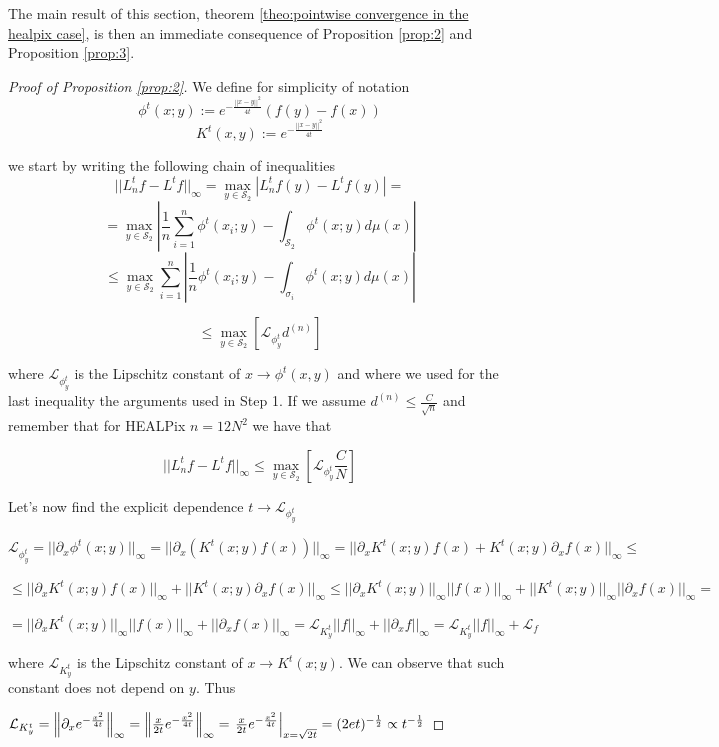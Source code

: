 The main result of this section, theorem  \ref{theo:pointwise convergence in the healpix case}, is then an immediate consequence of Proposition \ref{prop:2} and Proposition \ref{prop:3}.


\begin{proof}[Proof of Proposition \ref{prop:2}]
	
	We define for simplicity of notation
	$$\phi^t(x;y) := e^{-\frac{||x-y||^2}{4t}}\left(f(y)-f(x)\right)$$
	$$K^t(x,y) :=  e^{-\frac{||x-y||^2}{4t}}$$

	
	we start by writing the following chain of inequalities
	$$||L_n^tf-L^tf||_\infty = \max _{y\in \mathcal S_2} \left|L_n^tf(y)-L^tf(y)\right|=$$
	$$= \max _{y\in \mathcal S_2} \left| \frac{1}{n} \sum_{i=1}^n \phi^t(x_i; y)- \int_{\mathcal S_2} \phi^t(x;y)d\mu(x) \right|$$
	$$\leq \max _{y\in \mathcal S_2}  \sum_{i=1}^n   \left| \frac{1}{n}  \phi^t(x_i; y)- \int_{\sigma_i} \phi^t(x;y)d\mu(x) \right|$$

	$$\leq  \max _{y\in \mathcal S_2} \left[\mathcal L_{\phi^t_y}d^{(n)} \right]$$
	
	where $\mathcal L_{\phi^t_y}$ is the Lipschitz constant of $x \rightarrow \phi^t(x, y)$ and where we used for the last inequality the arguments used in Step 1. If we assume $d^{(n)}\leq \frac{C}{\sqrt{n}}$ and remember that for HEALPix $n=12N^2$ we have that
	
	$$||L_n^tf-L^tf||_\infty  \leq  \max _{y\in \mathcal S_2} \left[ \mathcal L_{\phi^t_y} \frac{C}{N} \right]$$
	
	Let's now find the explicit dependence $t\rightarrow \mathcal L_{\phi^t_y}$
	
	$\mathcal L_{\phi^t_y} = ||\partial_x\phi^t(x;y)||_\infty = ||\partial_x\left(K^t(x;y)f(x)\right)||_\infty = ||\partial_x K^t(x;y)f(x) + K^t(x;y)\partial_x f(x)||_\infty \leq$
	
	$ \leq ||\partial_x K^t(x;y)f(x)||_\infty + ||K^t(x;y)\partial_x f(x)||_\infty \leq  ||\partial_x K^t(x;y)||_\infty||f(x)||_\infty + ||K^t(x;y)||_\infty||\partial_x f(x)||_\infty = $
	
	$ = ||\partial_x K^t(x;y)||_\infty||f(x)||_\infty + ||\partial_x f(x)||_\infty = \mathcal L_{K^t_y} ||f||_\infty + ||\partial_xf||_\infty = \mathcal L_{K^t_y} ||f||_\infty + \mathcal L_f$
	
	where $\mathcal L_{K^t_y}$ is the Lipschitz constant of $x\rightarrow K^t(x;y)$. We can observe that such constant does not depend on $y$. Thus
	
	$\mathcal L_{K^t_y} = \left\lVert\partial_x e^{-\frac{x^2}{4t}}\right\rVert_\infty = \left\lVert\frac{x}{2t}e^{-\frac{x^2}{4t}}\right\rVert_\infty = \left. \frac{x}{2t}e^{-\frac{x^2}{4t}}\right|_{x=\sqrt{2t}}=(2et)^{-\frac{1}{2}}\propto t ^ {-\frac{1}{2}}$
	

\end{proof}
